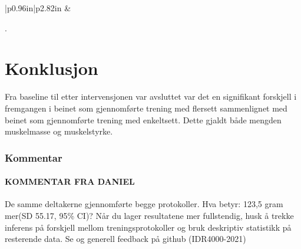 \documentclass[
]{book}
\begin{document}
\begin{longtable}[c]{|p{0.96in}|p{2.82in}}
 &  \\

\noalign{\global\setlength{\arrayrulewidth}{2pt}}



\end{longtable}

.

\hypertarget{konklusjon}{%
\section{Konklusjon}\label{konklusjon}}

Fra baseline til etter intervensjonen var avsluttet var det en signifikant forskjell i fremgangen i beinet som gjennomførte trening med flersett sammenlignet med beinet som gjennomførte trening med enkeltsett. Dette gjaldt både mengden muskelmasse og muskelstyrke.

\hypertarget{kommentar}{%
\subsubsection{Kommentar}\label{kommentar}}

\hypertarget{kommentar-fra-daniel}{%
\paragraph{KOMMENTAR FRA DANIEL}\label{kommentar-fra-daniel}}

De samme deltakerne gjennomførte begge protokoller. Hva betyr: 123,5 gram mer(SD 55.17, 95\% CI)? Når du lager resultatene mer fullstendig, husk å trekke inferens på forskjell mellom treningsprotokoller og bruk deskriptiv statistikk på resterende data. Se og generell feedback på github (IDR4000-2021)

  
\end{document}
